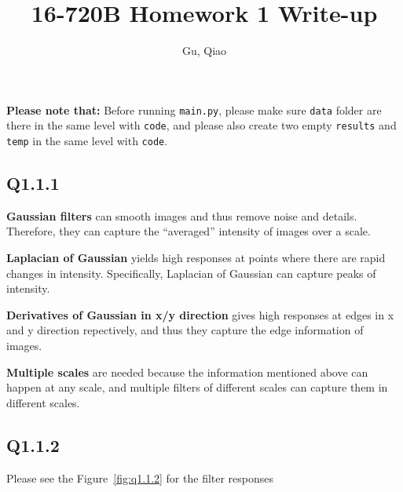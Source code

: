 \documentclass[11pt]{article}
\newcommand{\code}[1]{\texttt{#1}}
\begin{document}
\author{Gu, Qiao}
\title{16-720B Homework 1 Write-up}
\maketitle

\medskip

\textbf{Please note that:} Before running \code{main.py}, please make sure \code{data} folder are there in the same level with \code{code}, and please also create two empty \code{results} and \code{temp} in the same level with \code{code}.

\subsection*{Q1.1.1}

\textbf{Gaussian filters} can smooth images and thus remove noise and details. Therefore, they can capture the ``averaged'' intensity of images over a scale.

\textbf{Laplacian of Gaussian} yields high responses at points where there are rapid changes in intensity. Specifically, Laplacian of Gaussian can capture peaks of intensity.

\textbf{Derivatives of Gaussian in x/y direction} gives high responses at edges in x and y direction repectively, and thus they capture the edge information of images.

\textbf{Multiple scales} are needed because the information mentioned above can happen at any scale, and multiple filters of different scales can capture them in different scales.

\newpage

\subsection*{Q1.1.2}

Please see the Figure~\ref{fig:q1.1.2} for the filter responses
\end{document}
